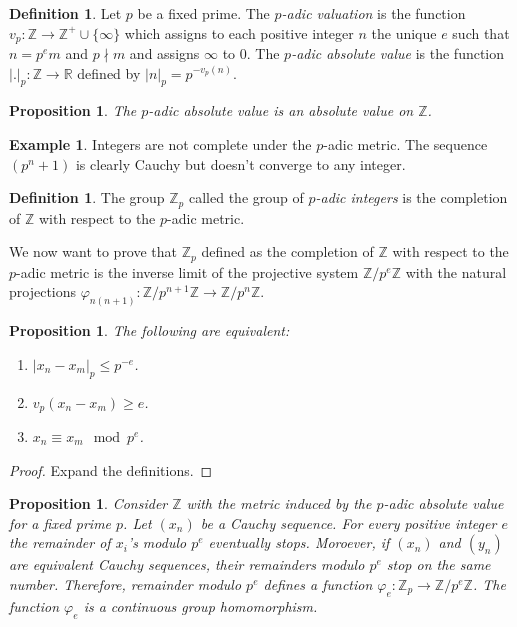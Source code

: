 \documentclass[12pt]{article}
\newtheorem{prop}[thm]{Proposition}
\theoremstyle{definition}
\newtheorem{dfn}[thm]{Definition}
\newtheorem{exm}[thm]{Example}
\theoremstyle{remark}
\begin{document}

    \begin{dfn}
        Let $p$ be a fixed prime. The \emph{$p$-adic valuation} is the function $v_p\colon\mathbb{Z}\to\mathbb{Z^+}\cup\{\infty\}$ which assigns to each positive integer $n$ the unique $e$ such that $n=p^em$ and $p\nmid m$ and assigns $\infty$ to 0. The \emph{$p$-adic absolute value} is the function $|.|_p\colon\mathbb{Z}\to \mathbb{R}$ defined by $|n|_p=p^{-v_p(n)}$.
    \end{dfn}

    \begin{prop}
        The $p$-adic absolute value is an absolute value on $\mathbb{Z}$.
    \end{prop}

    \begin{exm}
        Integers are not complete under the $p$-adic metric. The sequence $(p^n+1)$ is clearly Cauchy but doesn't converge to any integer. 
    \end{exm}

    \begin{dfn}
        The group $\mathbb{Z}_p$ called the group of \emph{$p$-adic integers} is the completion of $\mathbb{Z}$ with respect to the $p$-adic metric.
    \end{dfn}

    We now want to prove that $\mathbb{Z}_p$ defined as the completion of $\mathbb{Z}$ with respect to the $p$-adic metric is the inverse limit of the projective system $\mathbb{Z}/p^e\mathbb{Z}$ with the natural projections $\varphi_{n(n+1)}\colon \mathbb{Z}/p^{n+1}\mathbb{Z}\to \mathbb{Z}/p^{n}\mathbb{Z}$.

    \begin{prop}
        The following are equivalent:
        \begin{enumerate}[label=(\alph*)]
            \item $|x_n-x_m|_p\leq p^{-e}$.
            \item $v_p(x_n-x_m)\geq e$.
            \item $x_n\equiv x_m \mod p^e$.
        \end{enumerate}
    \end{prop}

    \begin{proof}
        Expand the definitions.
    \end{proof}

    \begin{prop}
        Consider $\mathbb{Z}$ with the metric induced by the $p$-adic absolute value for a fixed prime $p$. Let $(x_n)$ be a Cauchy sequence. For every positive integer $e$ the remainder of $x_i$'s modulo $p^e$ eventually stops. Moroever, if $(x_n)$ and $(y_n)$ are equivalent Cauchy sequences, their remainders modulo $p^e$ stop on the same number. Therefore, remainder modulo $p^e$ defines a function $\varphi_e\colon \mathbb{Z}_p\to \mathbb{Z}/p^e\mathbb{Z}$. The function $\varphi_e$ is a continuous group homomorphism.
    \end{prop}
\end{document}
